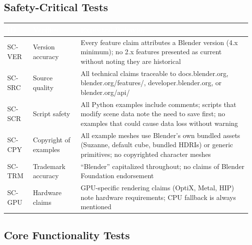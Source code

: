 \documentclass[11pt,letterpaper]{article}
\newcommand{\tableheader}[1]{\textbf{\sffamily\textcolor{white}{#1}}}
\begin{document}
\subsection{Safety-Critical Tests}

\begin{center}
\begin{tabularx}{\textwidth}{L{1.5cm}L{4cm}X}
\toprule
{}
\tableheader{ID} & \tableheader{Verifies} & \tableheader{Expected Behavior} \\
\midrule
SC-VER & Version accuracy & Every feature claim attributes a Blender version (4.x minimum); no 2.x features presented as current without noting they are historical \\
SC-SRC & Source quality & All technical claims traceable to docs.blender.org, blender.org/features/, developer.blender.org, or blender.org/api/ \\
SC-SCR & Script safety & All Python examples include comments; scripts that modify scene data note the need to save first; no examples that could cause data loss without warning \\
SC-CPY & Copyright of examples & All example meshes use Blender's own bundled assets (Suzanne, default cube, bundled HDRIs) or generic primitives; no copyrighted character meshes \\
SC-TRM & Trademark accuracy & ``Blender'' capitalized throughout; no claims of Blender Foundation endorsement \\
SC-GPU & Hardware claims & GPU-specific rendering claims (OptiX, Metal, HIP) note hardware requirements; CPU fallback is always mentioned \\
\bottomrule
\end{tabularx}
\end{center}

\subsection{Core Functionality Tests}
\end{document}
